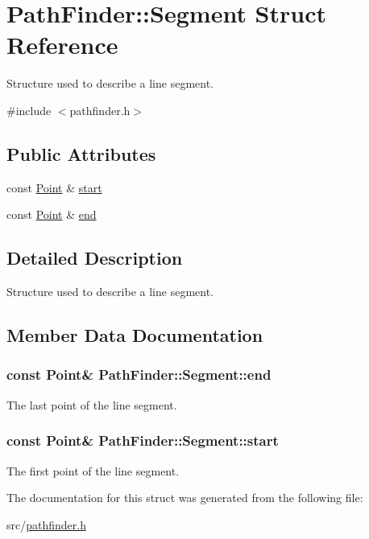 \hypertarget{structPathFinder_1_1Segment}{
\section{PathFinder::Segment Struct Reference}
\label{structPathFinder_1_1Segment}
}


Structure used to describe a line segment.  




{\ttfamily \#include $<$pathfinder.h$>$}

\subsection*{Public Attributes}
\begin{DoxyCompactItemize}
\item 
const \hyperlink{structPathFinder_1_1Point}{Point} \& \hyperlink{structPathFinder_1_1Segment_a1ec477176697cf6c05a631cbc872f78b}{start}
\item 
const \hyperlink{structPathFinder_1_1Point}{Point} \& \hyperlink{structPathFinder_1_1Segment_a4e796c682f141afb83836b078b525c28}{end}
\end{DoxyCompactItemize}


\subsection{Detailed Description}
Structure used to describe a line segment. 

\subsection{Member Data Documentation}
\hypertarget{structPathFinder_1_1Segment_a4e796c682f141afb83836b078b525c28}{
\subsubsection[{end}]{\setlength{\rightskip}{0pt plus 5cm}const {\bf Point}\& {\bf PathFinder::Segment::end}}}
\label{structPathFinder_1_1Segment_a4e796c682f141afb83836b078b525c28}
The last point of the line segment. \hypertarget{structPathFinder_1_1Segment_a1ec477176697cf6c05a631cbc872f78b}{
\subsubsection[{start}]{\setlength{\rightskip}{0pt plus 5cm}const {\bf Point}\& {\bf PathFinder::Segment::start}}}
\label{structPathFinder_1_1Segment_a1ec477176697cf6c05a631cbc872f78b}
The first point of the line segment. 

The documentation for this struct was generated from the following file:\begin{DoxyCompactItemize}
\item 
src/\hyperlink{pathfinder_8h}{pathfinder.h}\end{DoxyCompactItemize}
